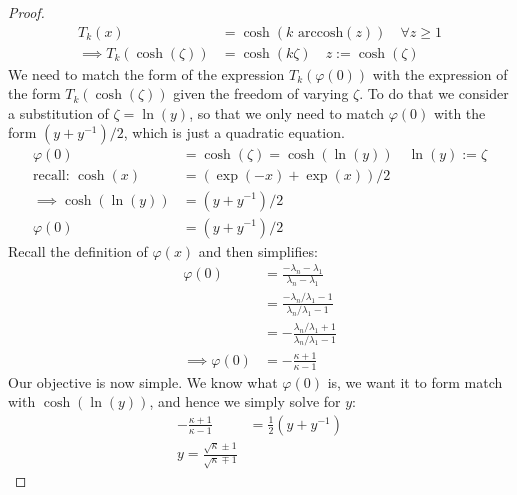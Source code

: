 \documentclass[]{article}
\theoremstyle{definition}
\begin{document}
\begin{proof}
\begin{align}
                    T_k(x) &= \cosh(k\text{ arccosh}(z)) \quad \forall z \ge 1
                    \\
                    \implies
                    T_k(\cosh(\zeta)) &= \cosh(k\zeta) \quad z := \cosh(\zeta)
                \end{align}
                We need to match the form of the expression $T_k(\varphi(0))$ with the expression of the form $T_k(\cosh(\zeta))$ given the freedom of varying $\zeta$. To do that we consider a substitution of $\zeta = \ln(y)$, so that we only need to match $\varphi(0)$ with the form $(y + y^{-1})/2$, which is just a quadratic equation. 
                \begin{align}
                    \varphi(0) &= \cosh(\zeta) = \cosh(\ln(y)) \quad \ln(y) := \zeta
                    \\
                    \text{recall: } \cosh(x) &= (\exp(-x) + \exp(x))/2
                    \\
                    \implies 
                    \cosh(\ln(y)) &= (y + y^{-1})/2
                    \\
                    \varphi(0) &= (y + y^{-1})/2
                \end{align}
                Recall the definition of $\varphi(x)$ and then simplifies: 
                $$
                \begin{aligned}
                    \varphi(0) &= \frac{-\lambda_n - \lambda_1}{\lambda_n - \lambda_1}
                    \\
                    &= \frac{-\lambda_n/\lambda_1 - 1}{\lambda_n/\lambda_1 - 1}
                    \\ 
                    &= - 
                    \frac{\lambda_n/\lambda_1 + 1}{\lambda_n/\lambda_1 - 1} 
                    \\
                    \implies \varphi(0) &=
                    -\frac{\kappa + 1}{\kappa - 1}
                \end{aligned}
                $$
                Our objective is now simple. We know what $\varphi(0)$ is, we want it to form match with $\cosh(\ln(y))$, and hence we simply solve for $y$: 
                \begin{align}
                    -\frac{\kappa + 1}{\kappa - 1} &= 
                    \frac{1}{2}(y + y^{-1})
                    \\
                    y = \frac{\sqrt{\kappa}\pm 1}{\sqrt{\kappa}\mp 1}
                \end{align}

\end{proof}
\end{document}
